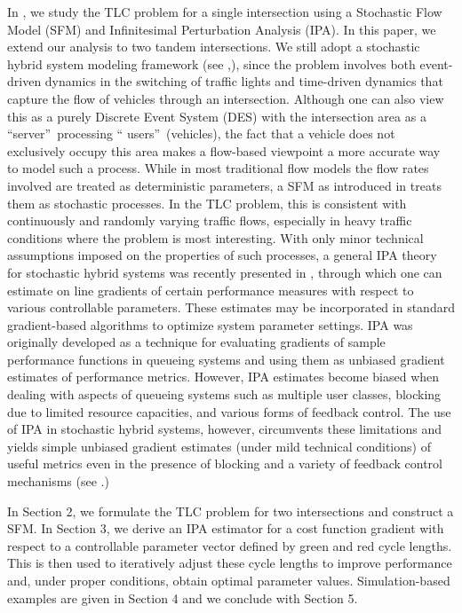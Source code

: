 \documentclass{ifacconf}\usepackage{graphicx}
\begin{document}
In \cite{GengCDC12}, we study the TLC problem for a single intersection using
a Stochastic Flow Model (SFM) and Infinitesimal Perturbation Analysis (IPA).
In this paper, we extend our analysis to two tandem intersections. We still
adopt a stochastic hybrid system modeling framework (see \cite{Cassandras08},\cite{Cassandras06}), since the problem involves both event-driven dynamics
in the switching of traffic lights and time-driven dynamics that capture the
flow of vehicles through an intersection. Although one can also view this as a
purely Discrete Event System (DES) with the intersection area as a
\textquotedblleft server\textquotedblright\ processing \textquotedblleft
users\textquotedblright\ (vehicles), the fact that a vehicle does not
exclusively occupy this area makes a flow-based viewpoint a more accurate way
to model such a process. While in most traditional flow models the flow rates
involved are treated as deterministic parameters, a SFM as introduced in
\cite{Cassandras02} treats them as stochastic processes. In the TLC problem,
this is consistent with continuously and randomly varying traffic flows,
especially in heavy traffic conditions where the problem is most interesting.
With only minor technical assumptions imposed on the properties of such
processes, a general IPA theory for stochastic hybrid systems was recently
presented in \cite{Wardi10},\cite{Cassandras10} through which one can estimate
on line gradients of certain performance measures with respect to various
controllable parameters. These estimates may be incorporated in standard
gradient-based algorithms to optimize system parameter settings. IPA was
originally developed as a technique for evaluating gradients of sample
performance functions in queueing systems and using them as unbiased gradient
estimates of performance metrics. However, IPA estimates become biased when
dealing with aspects of queueing systems such as multiple user classes,
blocking due to limited resource capacities, and various forms of feedback
control. The use of IPA in stochastic hybrid systems, however, circumvents
these limitations and yields simple unbiased gradient estimates (under mild
technical conditions) of useful metrics even in the presence of blocking and a
variety of feedback control mechanisms (see \cite{Yao11}.)

In Section 2, we formulate the TLC problem for two intersections and construct
a SFM. In Section 3, we derive an IPA estimator for a cost function gradient
with respect to a controllable parameter vector defined by green and red cycle
lengths. This is then used to iteratively adjust these cycle lengths to
improve performance and, under proper conditions, obtain optimal parameter
values. Simulation-based examples are given in Section 4 and we conclude with
Section 5.
\end{document}
